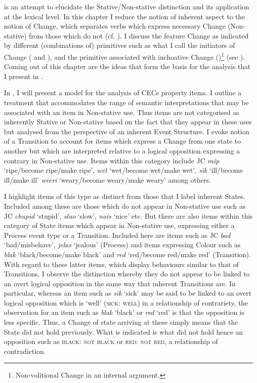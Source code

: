  is an attempt to elucidate the Stative\slash Non-stative distinction and
its application at the lexical level.  In this chapter I reduce the notion of
inherent aspect to the notion of Change, which separates verbs which express
necessary Change (Non-stative) from those which do not (cf.
\citealt{Comrie1976}).  I discuss the feature Change as indicated by different
(combinations of) primitives such as what I call the initiators of Change (\CAUSE
and \DO), and the primitive associated with inchoative Change
(\BECOME)\footnote{Non-volitional Change in an internal argument.}  (see
\citealt{Dowty1979,Carter1976,McCawley1968}). Coming out of this chapter are the
ideas that form the basis for the analysis that I present in .

In , I will present a model for the analysis of CECs property items.
I outline a treatment that accommodates the range of semantic interpretations
that may be associated with an item in Non-stative use.  Thus items are not
categorised as inherently Stative or Non-stative based on the fact that they
appear in these uses but analysed from the perspective of an inherent Event
Structure.  I evoke  notion of a
Transition to account for items which express a Change from one state to another
but which are interpreted relative to a logical opposition expressing a contrary
in Non-stative use. Items within this category include JC \textit{raip}
`ripe\slash become ripe\slash make ripe', \textit{wet} `wet\slash become wet\slash make wet',
\textit{sik} `ill\slash become ill\slash make ill' \textit{weeri} `weary\slash become weary\slash make
weary' among others.

I highlight items of this type as distinct from those that I label inherent
States. Included among these are those which do not appear in Non-stative use
such as JC \textit{chupid} `stupid', \textit{sluo} `slow', \textit{nais} `nice'
etc. But there are also items within this category of State items which appear
in Non-stative use, expressing either a Process event type or a Transition.
Included here are items such as JC \textit{bad} `bad\slash misbehave', \textit{jelas}
`jealous' (Process) and items expressing Colour such as \textit{blak}
`black\slash become\slash make black' and \textit{red} `red\slash become red\slash make red'
(Transition). With regard to these latter items, which display behaviours
similar to that of Transitions, I observe the distinction whereby they do not
appear to be linked to an overt logical opposition in the same way that inherent
Transitions are. In particular, whereas an item such as \textit{sik} `sick' may
be said to be linked to an overt logical opposition which is `well' (\textsc{sick: well})
in a relationship of contrariety, the observation for an item such as
\textit{blak} `black' or \textit{red} `red' is that the opposition is less
specific. Thus, a Change of state arriving at these simply means that the State
did not hold previously. What is indicated is what did not hold hence an
opposition such as \textsc{black: not black} or \textsc{red: not red}, a relationship of
contradiction.

